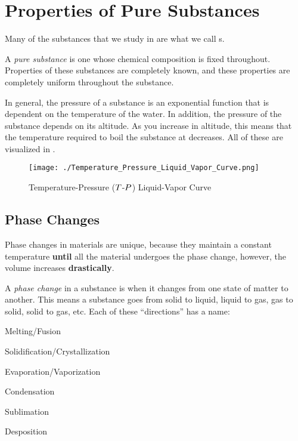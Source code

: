 \section{Properties of Pure Substances}\label{sec:Properties_Pure_Substances}
Many of the substances that we study in  are what we call s.

\begin{definition}\label{def:Pure_Substance}
  A \emph{pure substance} is one whose chemical composition is fixed throughout.
  Properties of these substances are completely known, and these properties are completely uniform throughout the substance.
\end{definition}

In general, the pressure of a substance is an exponential function that is dependent on the temperature of the water.
In addition, the pressure of the substance depends on its altitude.
As you increase in altitude, this means that the temperature required to boil the substance at decreases.
All of these are visualized in .

\begin{figure}[h!tbp]
  \centering
  \texttt{[image: ./Temperature\_Pressure\_Liquid\_Vapor\_Curve.png]}
  \caption{Temperature-Pressure ($T$-$P$) Liquid-Vapor Curve}
  \label{fig:Temp_Pressure_Liquid_Vapor_Curve}
\end{figure}

\subsection{Phase Changes}\label{subsec:Phase_Changes}
Phase changes in materials are unique, because they maintain a constant temperature \textbf{until} all the material undergoes the phase change, however, the volume increases \textbf{drastically}.

\begin{definition}\label{def:Phase_Change}
  A \emph{phase change} in a substance is when it changes from one state of matter to another.
  This means a substance goes from solid to liquid, liquid to gas, gas to solid, solid to gas, etc.
  Each of these ``directions'' has a name:
  \begin{description}[noitemsep]
  \item[Solid to Liquid:] Melting/Fusion
  \item[Liquid to Solid:] Solidification/Crystallization
  \item[Liquid to Gas:] Evaporation/Vaporization
  \item[Gas to Liquid:] Condensation
  \item[Solid to Gas:] Sublimation
  \item[Gas to Solid:] Desposition
  \end{description}
\end{definition}

